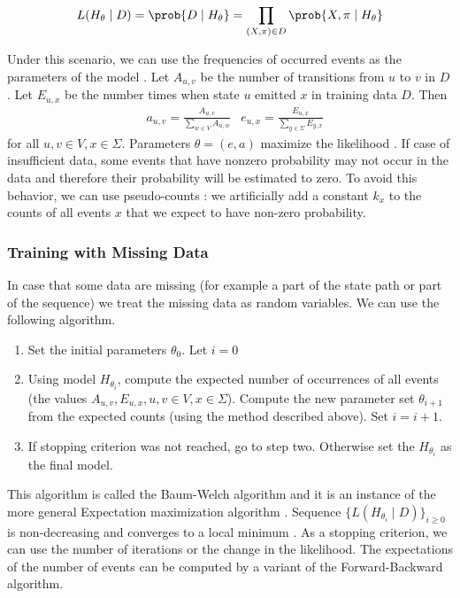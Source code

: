 \[L(H_\theta\mid D)=\prob{D\mid H_\theta}= \prod_{(X,\pi)\in D}\prob{X,\pi\mid H_\theta}\]

Under this scenario, we can use the frequencies of occurred events as the parameters of the model \cite{Durbin1998}.
Let $A_{u,v}$ be the number of transitions from $u$ to $v$ in $D$.
Let $E_{u,x}$ be the number times when state $u$ emitted $x$ in training data
$D$.
Then 
\begin{align*}
&a_{u,v}=\frac{A_{u,v}}{\sum_{w\in V}A_{u,w}}
&e_{u,x}=\frac{E_{u,x}}{\sum_{y\in\Sigma}E_{y,x}}
\end{align*}
for all $u,v\in V, x\in\Sigma$. Parameters $\theta=(e,a)$ maximize the likelihood
\cite{Durbin1998}. If case of insufficient data, some events that have
nonzero probability may not occur in the data and therefore their probability will be
estimated to zero. To avoid this behavior, we can use pseudo-counts
\cite{Durbin1998}: we artificially add a constant $k_x$ to the counts of all
events $x$ that we expect to have non-zero probability.

\subsubsection{Training with Missing Data} 
In case that some data are missing (for example a part
of the state path or part of the sequence) we treat the missing data as random
variables. We can use the following algorithm. 
\begin{enumerate}
\item  Set the initial parameters $\theta_0$. Let $i=0$
\item  Using model $H_{\theta_i}$, compute the expected number of occurrences of
all events (the values $A_{u,v}, E_{u,x}, u,v\in V,x\in\Sigma$). Compute the new
parameter set $\theta_{i+1}$ from the expected counts (using the method
described above). Set $i=i+1$.
\item If stopping criterion was not reached, go to step two. Otherwise 
set the $H_{\theta_{i}}$ as the final model.
\end{enumerate}
This algorithm is called the Baum-Welch algorithm and it is an instance of the
more general Expectation maximization algorithm \cite{Durbin1998}. Sequence $\{L(H_{\theta_i}\mid D)\}_{i\geq 0}$ is non-decreasing and
 converges to a local minimum \cite{Durbin1998}. As a stopping criterion,
we can use the number of iterations or the change in the likelihood.
 The expectations of the number of events can be
computed by a variant of the Forward-Backward algorithm.

